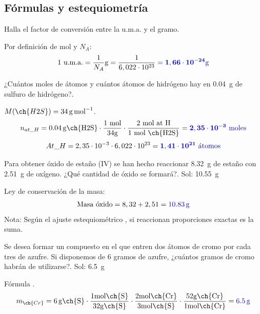 \subsection{Fórmulas y estequiometría}

\begin{exercise}
    Halla el factor de conversión entre la u.m.a. y el gramo.
    \begin{solu}
        Por definición de mol y $N_A$:
        \[ 1 \text{ u.m.a.} = \dfrac{1}{N_A} \si{\g} = \dfrac{1}{6,022 \cdot 10^{23}} = \mathbf{\textcolor{blue}{1,66 \cdot 10^{-24} \si{\g}}} \]
    \end{solu}
\end{exercise}

\begin{exercise}
    ¿Cuántos moles de átomos y cuántos átomos de hidrógeno hay en \qty{0.04}{\g} de sulfuro de hidrógeno?.
    \begin{solu}
        $M(\ch{H2S}) = \qty{34}{\g\per\mol}$.
        \[ n_{at\_H} = \qty{0,04}{\g \ch{H2S}} \cdot \dfrac{1 \text{ mol}}{34 \si{\g}} \cdot \dfrac{2 \text{ mol at H}}{1 \text{ mol \ch{H2S}}} = \mathbf{\textcolor{blue}{2,35 \cdot 10^{-3} \text{ moles}}} \]
        \[ At\_H = 2,35 \cdot 10^{-3} \cdot 6,022 \cdot 10^{23} = \mathbf{\textcolor{blue}{1,41 \cdot 10^{21} \text{ átomos}}} \]
    \end{solu}
\end{exercise}

\begin{exercise}
    Para obtener óxido de estaño (IV) se han hecho reaccionar \qty{8.32}{\g} de estaño con \qty{2.51}{\g} de oxígeno. ¿Qué cantidad de óxido se formará?. Sol: \qty{10.55}{\g}
    \begin{solu}
        Ley de conservación de la masa:
        \[ \text{Masa óxido} = 8,32 + 2,51 = \mathbf{\textcolor{blue}{\qty{10,83}{\g}}} \]
        Nota: Según el ajuste estequiométrico , si reaccionan proporciones exactas es la suma.
    \end{solu}
\end{exercise}

\begin{exercise}
    Se desea formar un compuesto en el que entren dos átomos de cromo por cada tres de azufre. Si disponemos de 6 gramos de azufre, ¿cuántos gramos de cromo habrán de utilizarse?. Sol: \qty{6.5}{\g}
    \begin{solu}
        Fórmula .
        \[ m_{\ch{Cr}} = \qty{6}{\g \ch{S}} \cdot \dfrac{1 \si{\mol \ch{S}}}{32 \si{\g \ch{S}}} \cdot \dfrac{2 \si{\mol \ch{Cr}}}{3 \si{\mol \ch{S}}} \cdot \dfrac{52 \si{\g \ch{Cr}}}{1 \si{\mol \ch{Cr}}} = \mathbf{\textcolor{blue}{\qty{6,5}{\g}}} \]
    \end{solu}
\end{exercise}

